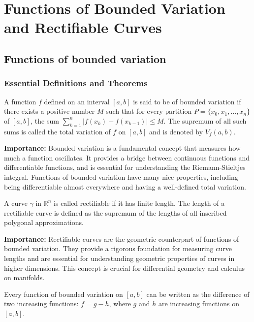 \chapter{Functions of Bounded Variation and Rectifiable Curves}

\section{Functions of bounded variation}

\subsection*{Essential Definitions and Theorems}

\begin{definition}
A function $f$ defined on an interval $[a, b]$ is said to be of bounded variation if there exists a positive number $M$ such that for every partition $P = \{x_0, x_1, \ldots, x_n\}$ of $[a, b]$, the sum $\sum_{k=1}^n |f(x_k) - f(x_{k-1})| \leq M$. The supremum of all such sums is called the total variation of $f$ on $[a, b]$ and is denoted by $V_f(a, b)$.
\end{definition}

\noindent\textbf{Importance:} Bounded variation is a fundamental concept that measures how much a function oscillates. It provides a bridge between continuous functions and differentiable functions, and is essential for understanding the Riemann-Stieltjes integral. Functions of bounded variation have many nice properties, including being differentiable almost everywhere and having a well-defined total variation.



\begin{definition}
A curve $\gamma$ in $\mathbb{R}^n$ is called rectifiable if it has finite length. The length of a rectifiable curve is defined as the supremum of the lengths of all inscribed polygonal approximations.
\end{definition}

\noindent\textbf{Importance:} Rectifiable curves are the geometric counterpart of functions of bounded variation. They provide a rigorous foundation for measuring curve lengths and are essential for understanding geometric properties of curves in higher dimensions. This concept is crucial for differential geometry and calculus on manifolds.



\begin{theorem}
Every function of bounded variation on $[a, b]$ can be written as the difference of two increasing functions: $f = g - h$, where $g$ and $h$ are increasing functions on $[a, b]$.
\end{theorem}

